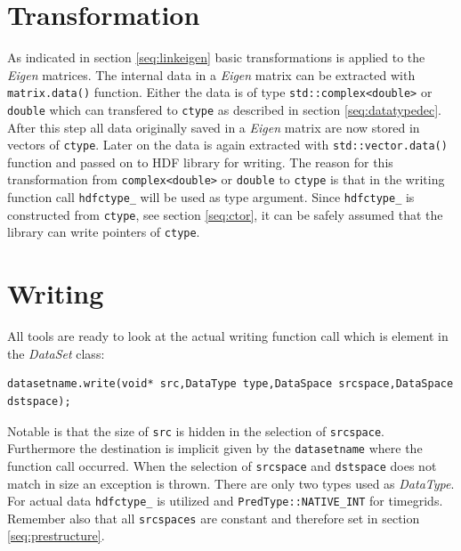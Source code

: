 \section{Transformation}
\label{seq:transform}
As indicated in section \ref{seq:linkeigen} basic transformations is applied to the \textit{Eigen} matrices. The internal data in a \textit{Eigen} matrix can be extracted with \texttt{matrix.data()} function. Either the data is of type \texttt{std::complex<double>} or \texttt{double} which can transfered to \texttt{ctype} as described in section \ref{seq:datatypedec}. After this step all data originally saved in a \textit{Eigen} matrix are now stored in vectors of \texttt{ctype}. Later on the data is again extracted with \texttt{std::vector.data()} function and passed on to HDF library for writing. The reason for this transformation from \texttt{complex<double>} or \texttt{double} to \texttt{ctype} is that in the writing function call \texttt{hdfctype\_} will be used as type argument. Since \texttt{hdfctype\_} is constructed from \texttt{ctype}, see section \ref{seq:ctor}, it can be safely assumed that the library can write pointers of \texttt{ctype}.

\section{Writing}
\label{seq:writing}
All tools are ready to look at the actual writing function call which is element in the \textit{DataSet} class:
\begin{lstlisting}
datasetname.write(void* src,DataType type,DataSpace srcspace,DataSpace dstspace);
\end{lstlisting}
Notable is that the size of \texttt{src} is hidden in the selection of \texttt{srcspace}. Furthermore the destination is implicit given by the \texttt{datasetname} where the function call occurred. When the selection of \texttt{srcspace} and \texttt{dstspace} does not match in size an exception is thrown. There are only two types used as \textit{DataType}. For actual data \texttt{hdfctype\_} is utilized and \texttt{PredType::NATIVE\_INT} for timegrids. Remember also that all \texttt{srcspaces} are constant and therefore set in section \ref{seq:prestructure}.

